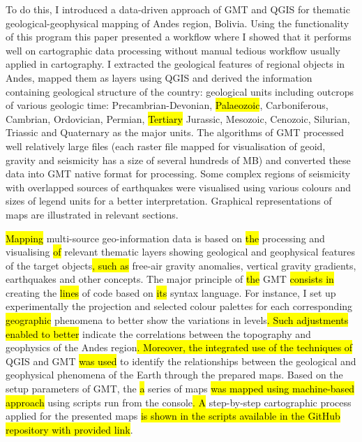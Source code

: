 \documentclass[data,article,submit,pdftex,moreauthors]{Definitions/mdpi}
\begin{document}
To do this, I introduced a data-driven approach of GMT and QGIS for thematic geological-geophysical mapping of Andes region, Bolivia. Using the functionality of this program this paper presented a workflow where I showed that it performs well on cartographic data processing without manual tedious workflow usually applied in cartography. I extracted the geological features of regional objects in Andes, mapped them as layers using QGIS and derived the information containing geological structure of the country: geological units including outcrops of various geologic time: Precambrian-Devonian, \hl{Palaeozoic}, Carboniferous, Cambrian, Ordovician, Permian, \hl{Tertiary} Jurassic, Mesozoic, Cenozoic, Silurian, Triassic and Quaternary as the major units. The algorithms of GMT processed well relatively large files (each raster file mapped for visualisation of geoid, gravity and seismicity has a size of several hundreds of MB) and converted these data into GMT native format for processing. Some complex regions of seismicity with overlapped sources of earthquakes were visualised using various colours and sizes of legend units for a better interpretation. Graphical representations of maps are illustrated in relevant sections. 

\hl{Mapping} multi-source geo-information data is based on \hl{the} processing and visualising \hl{of} relevant thematic layers showing geological and geophysical features of the target objects\hl{, such as} free-air gravity anomalies, vertical gravity gradients, earthquakes and other concepts. The major principle of \hl{the} GMT \hl{consists in} creating the \hl{lines} of code based on \hl{its} syntax language. For instance, I set up experimentally the projection and selected colour palettes for each corresponding \hl{geographic} phenomena to better show the variations in levels\hl{. Such adjustments enabled to better} indicate the correlations between the topography and geophysics of the Andes region\hl{. Moreover, the integrated use of the techniques of }QGIS and GMT \hl{was used} to identify the relationships between the geological and geophysical phenomena of the Earth through the prepared maps. Based on the setup parameters of GMT, the \hl{a }series of maps \hl{was mapped using machine-based approach} using scripts run from the console\hl{. A }step-by-step cartographic process applied for the presented maps \hl{is shown in the scripts available in the GitHub repository with provided link}.
\end{document}
